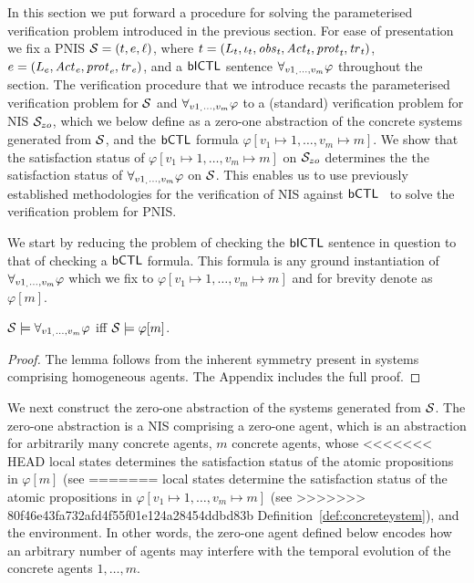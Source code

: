 In this section we put forward a procedure for solving the parameterised
verification problem introduced in the previous section. For ease of
presentation we fix a PNIS $\mathcal S = \left ( t, e, \ell \right )$, where ${t} =
\left ( L_{t}, \iota_{t}, \it{obs}_{t}, \it{Act}_{t}, \it{prot}_{t}, \it{tr}_{t}  \right )$, ${e} =
\left ( L_{e}, \it{Act}_{e}, \it{prot}_{e}, \it{tr}_{e}  \right )$, and a $\sf{bICTL}$ sentence
$\forall_{v1_,\ldots,v_m} \varphi$ throughout the section. The verification procedure that we
introduce recasts the parameterised verification problem for $\mathcal S$ and
$\forall_{v1_,\ldots,v_m} \varphi$  to a (standard) verification problem for NIS $\mathcal S_{zo}$, which
we below define as a zero-one abstraction of the concrete systems generated from
$\mathcal S$,  and the $\sf{bCTL}$ formula $\varphi[v_1 \mapsto 1, \ldots, v_m \mapsto
m]$.  We show that the satisfaction status of $\varphi[v_1 \mapsto 1, \ldots,
v_m \mapsto m]$ on $\mathcal S_{zo}$ determines the the satisfaction status of
$\forall_{v1_,\ldots,v_m} \varphi$ on $\mathcal S$. This enables us to use previously established
methodologies for the verification of NIS against $\sf{bCTL}$~\cite{Akintunde+20b}
to solve the verification problem for PNIS.


We start by reducing the problem of checking the $\sf{bICTL}$ sentence in question
to that of checking a $\sf{bCTL}$ formula. This formula is any ground instantiation
of $\forall_{v1_,\ldots,v_m} \varphi$ which we fix to $\varphi[v_1 \mapsto 1, \ldots, v_m \mapsto m]$
and for brevity denote as $\varphi[m]$.


\begin{lemma}
\label{lemma:symmetry}
$\mathcal S \models \forall_{v1_,\ldots,v_m} \varphi$ iff $\mathcal S \models \varphi[m]$.
\end{lemma}
\begin{proof}
The lemma follows from the inherent symmetry present in systems comprising
homogeneous agents. The Appendix includes the full proof.
\end{proof}

We next construct the zero-one abstraction of the systems generated from
$\mathcal S$. The zero-one abstraction is a NIS comprising a zero-one agent, which is
an abstraction for arbitrarily many concrete agents, $m$ concrete agents, whose
<<<<<<< HEAD
local states determines the satisfaction status of the atomic propositions in
$\varphi[m]$ (see
=======
local states determine the satisfaction status of the atomic propositions in
$\varphi[v_1 \mapsto 1, \ldots, v_m \mapsto m]$ (see
>>>>>>> 80f46e43fa732afd4f55f01e124a28454ddbd83b
Definition~\ref{def:concreteystem}), and the environment. In other words, the
zero-one agent defined below encodes how an arbitrary number of agents may
interfere with the temporal evolution of the concrete agents $1, \ldots, m$.

